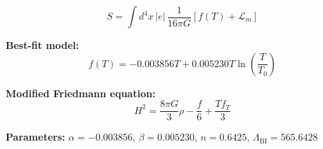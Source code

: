 
\begin{equation}
  S = \int d^4x \, |e| \, \frac{1}{16\pi G} \left[ f(T) + \mathcal{L}_m \right]
\end{equation}

\textbf{Best-fit model:}
\begin{equation}
  f(T) = -0.003856 T + 0.005230 T \ln\!\left(\frac{T}{T_0}\right)
\end{equation}

\textbf{Modified Friedmann equation:}
\begin{equation}
  H^2 = \frac{8\pi G}{3} \rho - \frac{f}{6} + \frac{T f_T}{3}
\end{equation}

\textbf{Parameters:}
$\alpha = -0.003856$, \quad
$\beta = 0.005230$, \quad
$n = 0.6425$, \quad
$\Lambda_{\text{BI}} = 565.6428$